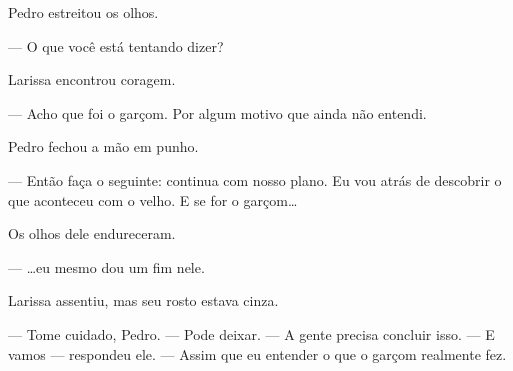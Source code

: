 Pedro estreitou os olhos.

— O que você está tentando dizer?

Larissa encontrou coragem.

— Acho que foi o garçom. Por algum motivo que ainda não entendi.

Pedro fechou a mão em punho.

— Então faça o seguinte: continua com nosso plano.  
Eu vou atrás de descobrir o que aconteceu com o velho.  
E se for o garçom…

Os olhos dele endureceram.

— …eu mesmo dou um fim nele.

Larissa assentiu, mas seu rosto estava cinza.

— Tome cuidado, Pedro.  
— Pode deixar.  
— A gente precisa concluir isso.  
— E vamos — respondeu ele. — Assim que eu entender o que o garçom realmente fez.
